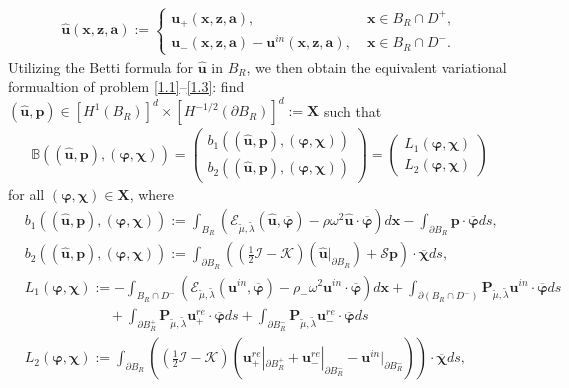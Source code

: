 \documentclass[final,reqno]{siamltex}
\newcommand{\om}{\omega}
\newcommand{\pa}{\partial}
\newcommand{\ov}{\overline}
\begin{document}
\begin{align*}
\mathbf{\hat u}(\mathbf{x},\mathbf{z},\mathbf{a}):=
\left\{
\begin{array}{ll}
	\mathbf{u}_+(\mathbf{x},\mathbf{z},\mathbf{a}),\;&\mathbf{x}\in B_R\cap D^+,\\ [1mm]
	\mathbf{u}_-(\mathbf{x},\mathbf{z},\mathbf{a})-\mathbf{u}^{in}(\mathbf{x},\mathbf{z},\mathbf{a}),\;&\mathbf{x}\in B_R\cap D^-. 
\end{array}
\right.
\end{align*}
Utilizing the Betti formula for $\mathbf{\hat u}$ in $B_R$, we then obtain the equivalent variational formualtion of problem \eqref{1.1}--\eqref{1.3}:  find $(\mathbf{\hat u},\mathbf{p})\in [H^1(B_R)]^d\times [H^{-1/2}(\pa B_R)]^d:=\mathbf{X}$ such that 
\begin{align}\label{4.3}
\mathbb{B}((\mathbf{\hat u},\mathbf{p}),(\boldsymbol{\varphi},\boldsymbol{\chi}))=
\left(
\begin{array}{l}
	b_1((\mathbf{\hat u},\mathbf{p}),(\boldsymbol{\varphi},\boldsymbol{\chi})) \\
	b_2((\mathbf{\hat u},\mathbf{p}),(\boldsymbol{\varphi},\boldsymbol{\chi})) 
\end{array}
\right)
=
\left(
\begin{array}{l}
	L_1(\boldsymbol{\varphi},\boldsymbol{\chi}) \\
	L_2(\boldsymbol{\varphi},\boldsymbol{\chi}) 
\end{array}
\right)
\end{align}
for all $(\boldsymbol{\varphi},\boldsymbol{\chi})\in\mathbf{X}$, where 
\begin{align*}
  &b_1((\mathbf{\hat u},\mathbf{p}),(\boldsymbol{\varphi},\boldsymbol{\chi})):=\int_{B_R}\left(\mathcal{E}_{\tilde{\mu},\tilde{\lambda}}(\mathbf{\hat u},\ov{\boldsymbol{\varphi}})-\rho\om^2\mathbf{\hat u}\cdot\ov{\boldsymbol{\varphi}}\right)d\mathbf{x}-\int_{\pa B_R}\mathbf{p}\cdot\ov{\boldsymbol{\varphi}}ds, \\
  &b_2((\mathbf{\hat u},\mathbf{p}),(\boldsymbol{\varphi},\boldsymbol{\chi})):=\int_{\pa B_R}\left((\frac{1}{2}\mathcal{I}-\mathcal{K})(\mathbf{\hat u}|_{\pa B_R})+\mathcal{S}\mathbf{p}\right)\cdot\ov{\boldsymbol{\chi}}ds, \\
  &L_1(\boldsymbol{\varphi},\boldsymbol{\chi}):=-\int_{B_R\cap D^-}\left(\mathcal{E}_{\tilde{\mu},\tilde{\lambda}}(\mathbf{u}^{in},\ov{\boldsymbol{\varphi}})-\rho_-\om^2\mathbf{u}^{in}\cdot\ov{\boldsymbol{\varphi}}\right)d\mathbf{x}+\int_{\pa(B_R\cap D^-)}\mathbf{P}_{\tilde{\mu},\tilde{\lambda}}\mathbf{u}^{in}\cdot\ov{\boldsymbol{\varphi}}ds \\
  &\qquad\qquad\qquad+\int_{\pa B_R^+}\mathbf{P}_{\tilde{\mu},\tilde{\lambda}}\mathbf{u}^{re}_+\cdot\ov{\boldsymbol{\varphi}}ds+\int_{\pa B_R^-}\mathbf{P}_{\tilde{\mu},\tilde{\lambda}}\mathbf{u}^{re}_-\cdot\ov{\boldsymbol{\varphi}}ds \\
  &L_2(\boldsymbol{\varphi},\boldsymbol{\chi}):=\int_{\pa B_R}\left((\frac{1}{2}\mathcal{I}-\mathcal{K})(\mathbf{u}^{re}_+|_{\pa B_R^+}+\mathbf{u}^{re}_-|_{\pa B_R^-}-\mathbf{u}^{in}|_{\pa B_R^-})\right)\cdot\ov{\boldsymbol{\chi}}ds, 
\end{align*}
\end{document}

